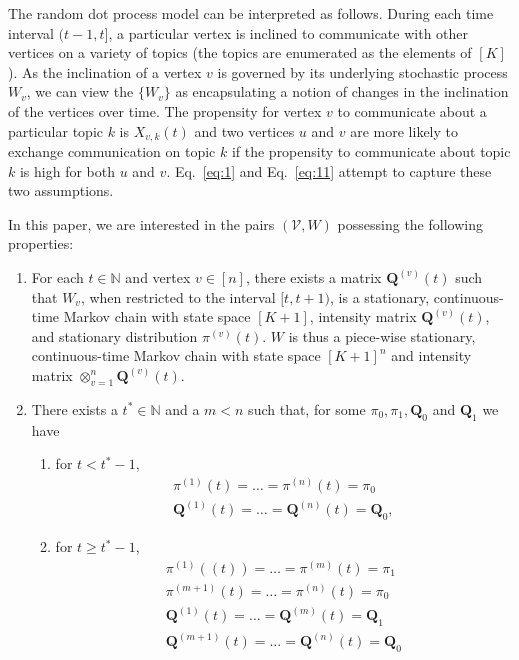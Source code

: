 \documentclass[10pt,draftclsnofoot,onecolumn]{IEEEtran}
\theoremstyle{definition}
\begin{document}
The random dot process model can be interpreted as follows. During
each time interval $(t-1,t]$, a particular vertex is inclined to
communicate with other vertices on a variety of topics (the topics are
enumerated as the elements of $[K]$). As the inclination of a vertex
$v$ is governed by its underlying stochastic process $W_v$, we can
view the $\{W_v\}$ as encapsulating a notion of changes in the
inclination of the vertices over time. The propensity for
vertex $v$ to communicate about a particular topic $k$ is $X_{v,k}(t)$
and two vertices $u$ and $v$ are more likely to exchange communication
on topic $k$ if the propensity to communicate about topic $k$ is high
for both $u$ and $v$. Eq.~\eqref{eq:1} and Eq.~\eqref{eq:11} attempt
to capture these two assumptions.

In this paper, we are interested in the pairs $(\mathscr{V}, W)$
possessing the following properties:
\begin{enumerate}
\item For each $t \in \mathbb{N}$ and vertex $v \in [n]$, there exists
  a matrix $\mathbf{Q}^{(v)}(t)$ such that $W_v$, when restricted to
  the interval $[t, t+1)$, is a stationary, continuous-time Markov
  chain with state space $[K+1]$, intensity matrix
  ${\mathbf{Q}^{(v)}(t)}$, and stationary distribution
  $\pi^{(v)}(t)$. $W$ is thus a piece-wise stationary, continuous-time
  Markov chain with state space $[K+1]^{n}$ and intensity matrix
  $\otimes_{v=1}^{n}\mathbf{Q}^{(v)}(t)$.
\item There exists a $t^{*} \in \mathbb{N}$ and a $m < n$ such that,
  for some $\pi_0, \pi_1, \mathbf{Q}_0$ and $\mathbf{Q}_1$ we have
  \begin{enumerate}
  \item for $t < t^{*} - 1$,
    \begin{gather*}
      \pi^{(1)}(t) = \dots = \pi^{(n)}(t) = \pi_0 \\
      \mathbf{Q}^{(1)}(t) = \dots = \mathbf{Q}^{(n)}(t) = \mathbf{Q}_0,
    \end{gather*}
  \item  for $t \geq t^{*} - 1$,
    \begin{gather*}
      \pi^{(1)}((t)) = \dots = \pi^{(m)}(t) = \pi_1 \\
      \pi^{(m+1)}(t)  = \dots = \pi^{(n)}(t) = \pi_0 \\
      \mathbf{Q}^{(1)}(t)  = \dots = \mathbf{Q}^{(m)}(t) = \mathbf{Q}_1 \\
      \mathbf{Q}^{(m+1)}(t) = \dots = \mathbf{Q}^{(n)}(t) = \mathbf{Q}_0 
    \end{gather*}
  \end{enumerate}
\end{enumerate}
\end{document}
